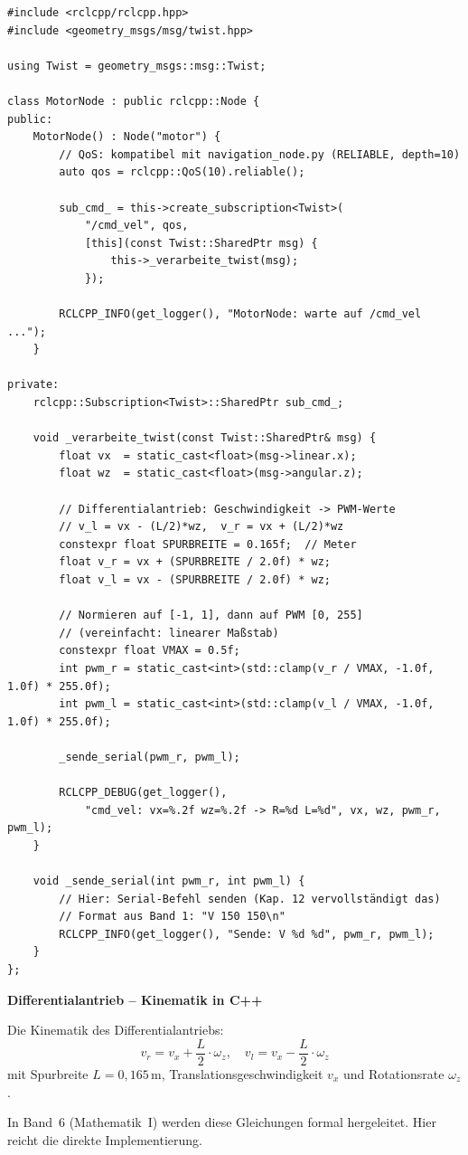 \begin{lstlisting}[style=cpp]
#include <rclcpp/rclcpp.hpp>
#include <geometry_msgs/msg/twist.hpp>

using Twist = geometry_msgs::msg::Twist;

class MotorNode : public rclcpp::Node {
public:
    MotorNode() : Node("motor") {
        // QoS: kompatibel mit navigation_node.py (RELIABLE, depth=10)
        auto qos = rclcpp::QoS(10).reliable();

        sub_cmd_ = this->create_subscription<Twist>(
            "/cmd_vel", qos,
            [this](const Twist::SharedPtr msg) {
                this->_verarbeite_twist(msg);
            });

        RCLCPP_INFO(get_logger(), "MotorNode: warte auf /cmd_vel ...");
    }

private:
    rclcpp::Subscription<Twist>::SharedPtr sub_cmd_;

    void _verarbeite_twist(const Twist::SharedPtr& msg) {
        float vx  = static_cast<float>(msg->linear.x);
        float wz  = static_cast<float>(msg->angular.z);

        // Differentialantrieb: Geschwindigkeit -> PWM-Werte
        // v_l = vx - (L/2)*wz,  v_r = vx + (L/2)*wz
        constexpr float SPURBREITE = 0.165f;  // Meter
        float v_r = vx + (SPURBREITE / 2.0f) * wz;
        float v_l = vx - (SPURBREITE / 2.0f) * wz;

        // Normieren auf [-1, 1], dann auf PWM [0, 255]
        // (vereinfacht: linearer Maßstab)
        constexpr float VMAX = 0.5f;
        int pwm_r = static_cast<int>(std::clamp(v_r / VMAX, -1.0f, 1.0f) * 255.0f);
        int pwm_l = static_cast<int>(std::clamp(v_l / VMAX, -1.0f, 1.0f) * 255.0f);

        _sende_serial(pwm_r, pwm_l);

        RCLCPP_DEBUG(get_logger(),
            "cmd_vel: vx=%.2f wz=%.2f -> R=%d L=%d", vx, wz, pwm_r, pwm_l);
    }

    void _sende_serial(int pwm_r, int pwm_l) {
        // Hier: Serial-Befehl senden (Kap. 12 vervollständigt das)
        // Format aus Band 1: "V 150 150\n"
        RCLCPP_INFO(get_logger(), "Sende: V %d %d", pwm_r, pwm_l);
    }
};
\end{lstlisting}

\begin{haubeBox}
\textbf{Differentialantrieb -- Kinematik in C++}

Die Kinematik des Differentialantriebs:
\[
v_r = v_x + \frac{L}{2} \cdot \omega_z, \quad
v_l = v_x - \frac{L}{2} \cdot \omega_z
\]
mit Spurbreite $L = 0{,}165$\,m, Translationsgeschwindigkeit $v_x$
und Rotationsrate $\omega_z$.

In Band~6 (Mathematik~I) werden diese Gleichungen formal hergeleitet.
Hier reicht die direkte Implementierung.
\end{haubeBox}

